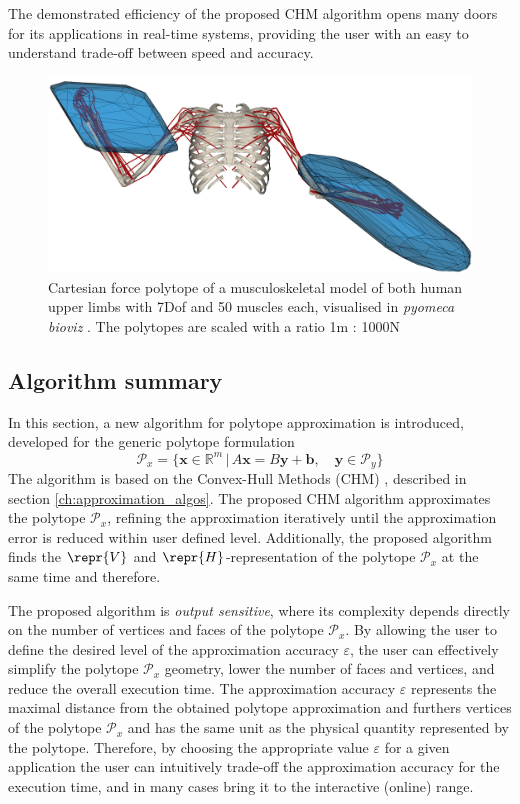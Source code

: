 The demonstrated efficiency of the proposed CHM algorithm opens many doors for its applications in real-time systems, providing the user with an easy to understand trade-off between speed and accuracy.


\begin{figure}[!t]
    \centering
    \includegraphics[width=0.5\linewidth]{Papers/images/bimanual.png}
    \caption{Cartesian force polytope of a musculoskeletal model of both human upper limbs  \cite{saul2015benchmarking} with 7Dof and 50 muscles each, visualised in \textit{pyomeca bioviz} \cite{Michaud2021}. The polytopes are scaled with a ratio 1m : 1000N}
    \label{fig:images_bimanual}
\end{figure}

\subsection{Algorithm summary}

In this section, a new algorithm for polytope approximation is introduced, developed for the generic polytope formulation
\begin{equation}
    \mathcal{P}_x = \big\{ \bm{x}\in \mathbb{R}^{m}\, |\,A\bm{x} = B\bm{y} + \bm{b}, \quad  \bm{y}\in\mathcal{P}_y  \big\}
    \label{eq:generic_polyt_view_revisit3}
\end{equation}
The algorithm is based on the Convex-Hull Methods (CHM) \cite{lassez1992quantifier}, described in section \ref{ch:approximation_algos}. The proposed CHM algorithm approximates the polytope $\mathcal{P}_x$, refining the approximation iteratively until the approximation error is reduced within user defined level. 
Additionally, the proposed algorithm finds the $\repr{V}$ and $\repr{H}$-representation of the polytope $\mathcal{P}_x$ at the same time and therefore.

The proposed algorithm is \textit{output sensitive}, where its complexity depends directly on the number of vertices and faces of the polytope  $\mathcal{P}_x$. By allowing the user to define the desired level of the approximation accuracy $\varepsilon$, the user can effectively simplify the polytope $\mathcal{P}_x$ geometry, lower the number of faces and vertices, and reduce the overall execution time. 
The approximation accuracy $\varepsilon$ represents the maximal distance from the obtained polytope approximation and furthers vertices of the polytope $\mathcal{P}_x$ and has the same unit as the physical quantity represented by the polytope. 
Therefore, by choosing the appropriate value $\varepsilon$ for a given application the user can intuitively trade-off the approximation accuracy for the execution time, and in many cases bring it to the interactive (online) range. 

